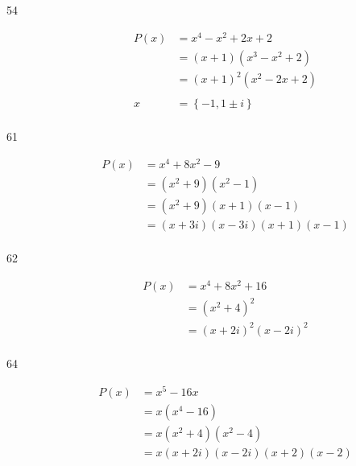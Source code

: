 \documentclass{exam}
\begin{document}
\begin{description}
      \item[54]
        \begin{align*}
          P(x)    &= x^4 - x^2 + 2x + 2 \\
                  &= (x + 1) \left( x^3 - x^2 + 2 \right) \\
                  &= (x + 1)^2 \left(x^2 - 2x + 2\right) \\
               \\
          x       &= \boxed{\left\{ -1, 1 \pm i \right\}} \\
        \end{align*}


      \item[61]
        \begin{align*}
          P(x) &= x^4 + 8x^2 - 9 \\
               &= \left( x^2 + 9 \right) \left( x^2 - 1 \right) \\
               &= \left( x^2 + 9 \right) (x + 1) (x - 1) \\
               &= \boxed{(x + 3i) (x - 3i) (x + 1) (x - 1)} \\
        \end{align*}

      \item[62]
        \begin{align*}
          P(x) &= x^4 + 8x^2 + 16 \\
               &= \left( x^2 + 4 \right)^2 \\
               &= \boxed{(x + 2i)^2 (x - 2i)^2} \\
        \end{align*}

      \item[64]
        \begin{align*}
          P(x) &= x^5 - 16x \\
               &= x \left( x^4 - 16 \right) \\
               &= x \left( x^2 + 4 \right) \left( x^2 - 4 \right) \\
               &= \boxed{x (x + 2i) (x - 2i) (x + 2) (x - 2)} \\
        \end{align*}


\end{description}
\end{document}
